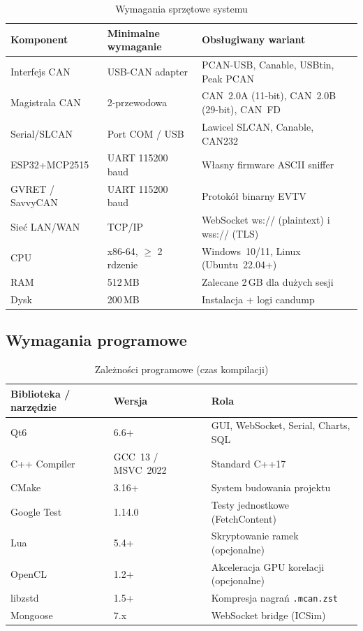\documentclass[12pt, a4paper]{article}
\begin{document}
\begin{table}[H]
\caption{Wymagania sprzętowe systemu}
\label{tab:hardware}
\centering
\small
\begin{tabular}{p{3.2cm}p{4.0cm}p{7.5cm}}
\toprule
\textbf{Komponent} & \textbf{Minimalne wymaganie} & \textbf{Obsługiwany wariant} \\
\midrule
Interfejs CAN    & USB-CAN adapter   & PCAN-USB, Canable, USBtin, Peak PCAN \\
Magistrala CAN   & 2-przewodowa      & CAN~2.0A (11-bit), CAN~2.0B (29-bit), CAN~FD \\
Serial/SLCAN     & Port COM / USB    & Lawicel SLCAN, Canable, CAN232 \\
ESP32+MCP2515    & UART 115200 baud  & Własny firmware ASCII sniffer \\
GVRET / SavvyCAN & UART 115200 baud  & Protokół binarny EVTV \\
Sieć LAN/WAN     & TCP/IP            & WebSocket ws:// (plaintext) i wss:// (TLS) \\
\midrule
CPU              & x86-64, $\geq$ 2 rdzenie & Windows~10/11, Linux (Ubuntu~22.04+) \\
RAM              & 512\,MB           & Zalecane 2\,GB dla dużych sesji \\
Dysk             & 200\,MB           & Instalacja + logi candump \\
\bottomrule
\end{tabular}
\end{table}

\subsection{Wymagania programowe}

\begin{table}[H]
\caption{Zależności programowe (czas kompilacji)}
\label{tab:software}
\centering
\small
\begin{tabular}{p{4.2cm}p{3.5cm}p{7.0cm}}
\toprule
\textbf{Biblioteka / narzędzie} & \textbf{Wersja} & \textbf{Rola} \\
\midrule
Qt6                & 6.6+              & GUI, WebSocket, Serial, Charts, SQL \\
C++ Compiler       & GCC~13 / MSVC~2022 & Standard C++17 \\
CMake              & 3.16+             & System budowania projektu \\
Google Test        & 1.14.0            & Testy jednostkowe (FetchContent) \\
Lua                & 5.4+              & Skryptowanie ramek (opcjonalne) \\
OpenCL             & 1.2+              & Akceleracja GPU korelacji (opcjonalne) \\
libzstd            & 1.5+              & Kompresja nagrań \texttt{.mcan.zst} \\
Mongoose           & 7.x               & WebSocket bridge (ICSim) \\
\bottomrule
\end{tabular}
\end{table}
\end{document}
